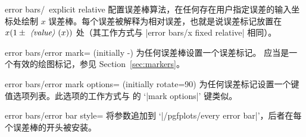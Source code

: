 {\begin{pgfplotsxykey}{error bars/\x\ explicit relative}
    配置误差棒算法，在任何存在用户指定误差的输入坐标处绘制 $x$ 误差棒。每个误差被解释为相对误差，也就是说误差标记放置在 $x (1 \pm \text{\meta{value}}(x))$ 处（其工作方式与 |error bars/x fixed relative| 相同）。
\begin{codeexample}[]
\end{codeexample}
\end{pgfplotsxykey}

\begin{pgfplotskey}{error bars/error mark= (initially -)}
    为任何误差棒设置一个误差标记。 应当是一个有效的绘图标记，参见 Section~\ref{sec:markers}。
\begin{codeexample}[]
\end{codeexample}
\end{pgfplotskey}

\begin{pgfplotskey}{error bars/error mark options= (initially rotate=90)}
    为任何误差标记设置一个键值选项列表。此选项的工作方式与 \Tikz{} 的 `|mark options|' 键类似。
\end{pgfplotskey}

\begin{pgfplotskey}{error bars/error bar style=}
    将参数追加到 `|/pgfplots/every error bar|'，后者在每个误差棒的开头被安装。
\end{pgfplotskey}

}
